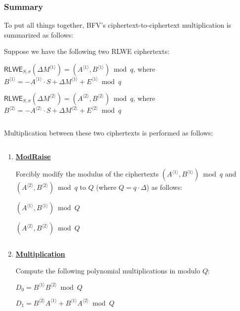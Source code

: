 \subsubsection{Summary}
\label{subsubsec:bfv-mult-cipher-summary}

To put all things together, BFV's ciphertext-to-ciphertext multiplication is summarized as follows:

\begin{tcolorbox}[title={\textbf{\tboxlabel{\ref*{subsubsec:bfv-mult-cipher-summary}} BFV's Ciphertext-to-Ciphertext Multiplication}}]


Suppose we have the following two RLWE ciphertexts:

$\textsf{RLWE}_{S, \sigma}(\Delta M^{\langle 1 \rangle}) = (A^{\langle 1 \rangle}, B^{\langle 1 \rangle}) \bmod q$, \text{ } where $B^{\langle 1 \rangle} = -A^{\langle 1 \rangle} \cdot S + \Delta M^{\langle 1 \rangle} + E^{\langle 1 \rangle} \bmod q$

$\textsf{RLWE}_{S, \sigma}(\Delta M^{\langle 2 \rangle}) = (A^{\langle 2 \rangle}, B^{\langle 2 \rangle})  \bmod q$, \text{ } where $B^{\langle 2 \rangle} = -A^{\langle 2 \rangle} \cdot S + \Delta M^{\langle 2 \rangle} + E^{\langle 2 \rangle} \bmod q$

$ $

Multiplication between these two ciphertexts is performed as follows:

$ $

\begin{enumerate}

\item \textbf{\underline{\textsf{ModRaise}}}

Forcibly modify the modulus of the ciphertexts $(A^{\langle 1 \rangle}, B^{\langle 1 \rangle}) \bmod q$ and $(A^{\langle 2 \rangle}, B^{\langle 2 \rangle}) \bmod q$ to $Q$ (where $Q = q \cdot \Delta$) as follows:

$(A^{\langle 1 \rangle}, B^{\langle 1 \rangle}) \bmod Q$

$(A^{\langle 2 \rangle}, B^{\langle 2 \rangle}) \bmod Q$


$ $

\item \textbf{\underline{Multiplication}}

Compute the following polynomial multiplications in modulo $Q$: 

$D_0 = B^{\langle 1 \rangle}B^{\langle 2 \rangle} \bmod Q$

$D_1 = B^{\langle 2 \rangle}A^{\langle 1 \rangle} +  B^{\langle 1 \rangle}A^{\langle 2 \rangle} \bmod Q$


\end{enumerate}
\end{tcolorbox}

